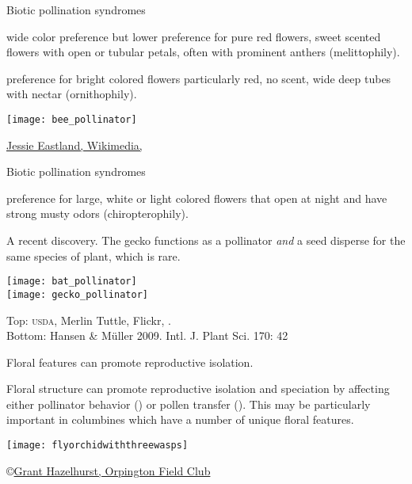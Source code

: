 \documentclass[t,handout]{beamer}  %
\begin{document}
\begin{frame}[t]{Biotic pollination syndromes}

	\begin{multicols}{2}
	\hangpara {} wide color preference but lower preference for pure red flowers, sweet scented flowers with open or tubular petals, often with prominent anthers (melittophily).
	
	\hangpara {} preference for bright colored flowers particularly red, no scent, wide deep tubes with nectar (ornithophily).

	\columnbreak
	
		\texttt{[image: bee\_pollinator]}
	
	\end{multicols}
	
	\vfilll
	
	\hfill \tiny \href{https://commons.wikimedia.org/wiki/File:Diadasia_Bee_Straddles_Cactus_Flower_Carpels_close-up.jpg}{Jessie Eastland, Wikimedia, }
\end{frame}
%
\begin{frame}[t]{Biotic pollination syndromes}

	\begin{multicols}{2}
	\hangpara {} preference for large, white or light colored flowers that open at night and have strong musty odors (chiropterophily).
	
	\hangpara {} A recent discovery. The gecko functions as a pollinator \emph{and} a seed disperse for the same species of plant, which is rare.
	
	\columnbreak
	
		\texttt{[image: bat\_pollinator]}\\
		\texttt{[image: gecko\_pollinator]}

	\end{multicols}

	\vfilll
	
	\hfill \tiny Top: \textsc{usda}, Merlin Tuttle, Flickr, .\\ \hfill Bottom: Hansen \& Müller 2009. Intl. J. Plant Sci. 170: 42
\end{frame}
%
\begin{frame}[t]{Floral features can promote reproductive isolation.}
	
	\begin{multicols}{2}
	\hangpara Floral structure can promote reproductive isolation and speciation by affecting either pollinator behavior () or pollen transfer (). This may be particularly important in columbines which have a number of unique floral features.  

	\columnbreak
	
		\texttt{[image: flyorchidwiththreewasps]}	
	\end{multicols}

	\vfilll
	
	\hfill \tiny \copyright \href{http://www.orpingtonfieldclub.org.uk/ofc-article002.html}{Grant Hazelhurst, Orpington Field Club}
\end{frame}
\end{document}
